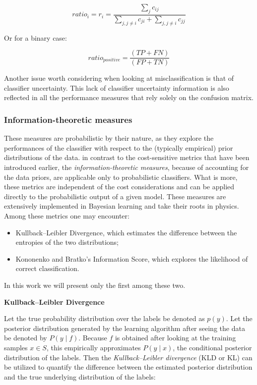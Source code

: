 \documentclass[12pt,]{article}
\providecommand{\tightlist}{%
  \setlength{\itemsep}{0pt}\setlength{\parskip}{0pt}}
\begin{document}
\begin{equation}
ratio_i = r_i = \frac{\sum_j c_{ij}}
  {\sum_{j, j \neq i} c_{ji} + \sum_{j, j \neq i} c_{jj}}
\end{equation}

Or for a binary case:

\begin{equation}
ratio_{positive} = \frac{(TP + FN)}{(FP + TN)}
\end{equation}

Another issue worth considering when looking at misclassification is
that of classifier uncertainty. This lack of classifier uncertainty
information is also reflected in all the performance measures that rely
solely on the confusion matrix.

\hypertarget{information-theoretic-measures}{%
\subsubsection{Information-theoretic
measures}\label{information-theoretic-measures}}

These measures are probabilistic by their nature, as they explore the
performances of the classifier with respect to the (typically empirical)
prior distributions of the data. in contrast to the cost-sensitive
metrics that have been introduced earlier, the
\emph{information-theoretic measures}, because of accounting for the
data priors, are applicable only to probabilistic classifiers. What is
more, these metrics are independent of the cost considerations and can
be applied directly to the probabilistic output of a given model. These
measures are extensively implemented in Bayesian learning and take their
roots in physics. Among these metrics one may encounter:

\begin{itemize}
\tightlist
\item
  Kullback--Leibler Divergence, which estimates the difference between
  the entropies of the two distributions;
\item
  Kononenko and Bratko's Information Score, which explores the
  likelihood of correct classification.
\end{itemize}

In this work we will present only the first among these two.

\textbf{Kullback--Leibler Divergence}

Let the true probability distribution over the labels be denoted as
\(p(y)\). Let the posterior distribution generated by the learning
algorithm after seeing the data be denoted by \(P (y \mid f)\). Because
\(f\) is obtained after looking at the training samples \(x \in S\),
this empirically approximates \(P (y \mid x)\), the conditional
posterior distribution of the labels. Then the \emph{Kullback--Leibler
divergence} (KLD or KL) can be utilized to quantify the difference
between the estimated posterior distribution and the true underlying
distribution of the labels:
\end{document}
